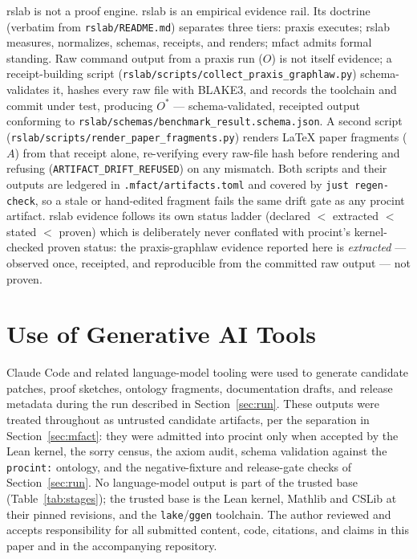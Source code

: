 \documentclass[11pt]{article}
\begin{document}
rslab is not a proof engine. rslab is an empirical evidence rail. Its
doctrine (verbatim from \texttt{rslab/README.md}) separates three tiers:
praxis executes; rslab measures, normalizes, schemas, receipts, and
renders; \textsf{mfact} admits formal standing. Raw command output from a
praxis run ($O$) is not itself evidence; a receipt-building script
(\texttt{rslab/scripts/collect\_praxis\_graphlaw.py}) schema-validates
it, hashes every raw file with BLAKE3, and records the toolchain and
commit under test, producing $O^*$ --- schema-validated, receipted output
conforming to \texttt{rslab/schemas/benchmark\_result.schema.json}. A
second script (\texttt{rslab/scripts/render\_paper\_fragments.py})
renders LaTeX paper fragments ($A$) from that receipt alone,
re-verifying every raw-file hash before rendering and refusing
(\texttt{ARTIFACT\_DRIFT\_REFUSED}) on any mismatch. Both scripts and
their outputs are ledgered in \texttt{.mfact/artifacts.toml} and covered
by \texttt{just regen-check}, so a stale or hand-edited fragment fails
the same drift gate as any \textsf{procint} artifact. rslab evidence
follows its own status ladder (declared $<$ extracted $<$ stated $<$
proven) which is deliberately never conflated with \textsf{procint}'s
kernel-checked proven status: the praxis-graphlaw evidence reported here
is \emph{extracted} --- observed once, receipted, and reproducible from
the committed raw output --- not proven.

\section{Use of Generative AI Tools}
\label{sec:ai-disclosure}

Claude Code and related language-model tooling were used to generate
candidate patches, proof sketches, ontology fragments, documentation
drafts, and release metadata during the run described in
Section~\ref{sec:run}. These outputs were treated throughout as untrusted
candidate artifacts, per the separation in Section~\ref{sec:mfact}: they
were admitted into \textsf{procint} only when accepted by the Lean kernel,
the sorry census, the axiom audit, schema validation against the
\texttt{procint:} ontology, and the negative-fixture and release-gate
checks of Section~\ref{sec:run}. No language-model output is part of the
trusted base (Table~\ref{tab:stages}); the trusted base is the Lean kernel,
Mathlib and CSLib at their pinned revisions, and the \texttt{lake}/\texttt{ggen}
toolchain. The author reviewed and accepts responsibility for all submitted
content, code, citations, and claims in this paper and in the accompanying
repository.
\end{document}
